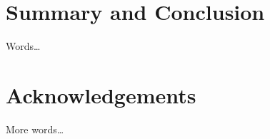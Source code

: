 \documentclass[conference]{IEEEtran}
\begin{document}
\section{Summary and Conclusion}

Words\ldots

\section{Acknowledgements}

More words\ldots




\end{document}
